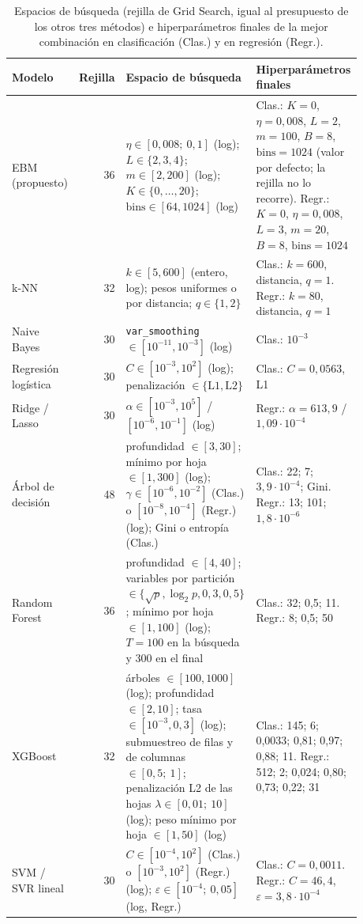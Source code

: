 \begin{table}[t]
  \centering\scriptsize\setlength{\tabcolsep}{3pt}
  \caption{Espacios de búsqueda (rejilla de Grid Search, igual al presupuesto de los otros tres métodos) e
  hiperparámetros finales de la mejor combinación en clasificación (Clas.) y en regresión (Regr.).}
  \label{tab:espacios}
  \begin{tabular}{@{}>{\raggedright\arraybackslash}p{0.13\linewidth} r >{\raggedright\arraybackslash}p{0.42\linewidth} >{\raggedright\arraybackslash}p{0.33\linewidth}@{}}
    \toprule
    Modelo & Rejilla & Espacio de búsqueda & Hiperparámetros finales \\
    \midrule
    EBM (propuesto) & 36 & $\eta \in [0{,}008;\ 0{,}1]$ (log); $L \in \{2, 3, 4\}$; $m \in [2, 200]$ (log); $K \in \{0, \dots, 20\}$; $\mathrm{bins} \in [64, 1024]$ (log) & Clas.: $K = 0$, $\eta = 0{,}008$, $L = 2$, $m = 100$, $B = 8$, $\mathrm{bins} = 1024$ (valor por defecto; la rejilla no lo recorre). Regr.: $K = 0$, $\eta = 0{,}008$, $L = 3$, $m = 20$, $B = 8$, $\mathrm{bins} = 1024$ \\
    k-NN & 32 & $k \in [5, 600]$ (entero, log); pesos uniformes o por distancia; $q \in \{1, 2\}$ & Clas.: $k = 600$, distancia, $q = 1$. Regr.: $k = 80$, distancia, $q = 1$ \\
    Naive Bayes & 30 & \texttt{var\_smoothing} $\in [10^{-11}, 10^{-3}]$ (log) & Clas.: $10^{-3}$ \\
    Regresión logística & 30 & $C \in [10^{-3}, 10^{2}]$ (log); penalización $\in \{\mathrm{L1}, \mathrm{L2}\}$ & Clas.: $C = 0{,}0563$, L1 \\
    Ridge / Lasso & 30 & $\alpha \in [10^{-3}, 10^{5}]$ / $[10^{-6}, 10^{-1}]$ (log) & Regr.: $\alpha = 613{,}9$ / $1{,}09 \cdot 10^{-4}$ \\
    Árbol de decisión & 48 & profundidad $\in [3, 30]$; mínimo por hoja $\in [1, 300]$ (log); $\gamma \in [10^{-6}, 10^{-2}]$ (Clas.) o $[10^{-8}, 10^{-4}]$ (Regr.) (log); Gini o entropía (Clas.) & Clas.: 22; 7; $3{,}9 \cdot 10^{-4}$; Gini. Regr.: 13; 101; $1{,}8 \cdot 10^{-6}$ \\
    Random Forest & 36 & profundidad $\in [4, 40]$; variables por partición $\in \{\sqrt{p}, \log_2 p, 0{,}3, 0{,}5\}$; mínimo por hoja $\in [1, 100]$ (log); $T = 100$ en la búsqueda y 300 en el final & Clas.: 32; 0,5; 11. Regr.: 8; 0,5; 50 \\
    XGBoost & 32 & árboles $\in [100, 1000]$ (log); profundidad $\in [2, 10]$; tasa $\in [10^{-3}, 0{,}3]$ (log); submuestreo de filas y de columnas $\in [0{,}5;\ 1]$; penalización L2 de las hojas $\lambda \in [0{,}01;\ 10]$ (log); peso mínimo por hoja $\in [1, 50]$ (log) & Clas.: 145; 6; 0,0033; 0,81; 0,97; 0,88; 11. Regr.: 512; 2; 0,024; 0,80; 0,73; 0,22; 31 \\
    SVM / SVR lineal & 30 & $C \in [10^{-4}, 10^{2}]$ (Clas.) o $[10^{-3}, 10^{2}]$ (Regr.) (log); $\varepsilon \in [10^{-4};\ 0{,}05]$ (log, Regr.) & Clas.: $C = 0{,}0011$. Regr.: $C = 46{,}4$, $\varepsilon = 3{,}8 \cdot 10^{-4}$ \\
    \bottomrule
  \end{tabular}
\end{table}

